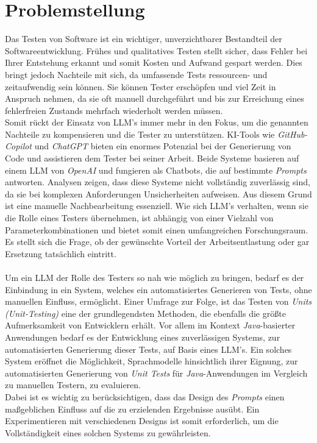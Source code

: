 \section{Problemstellung}\label{sec:prob}
Das Testen von Software ist ein wichtiger, unverzichtbarer Bestandteil der Softwareentwicklung. Frühes und qualitatives Testen stellt sicher, dass Fehler bei Ihrer Entstehung erkannt und somit Kosten und Aufwand gespart werden. Dies bringt jedoch Nachteile mit sich, da umfassende Tests ressourcen- und zeitaufwendig sein können. Sie können Tester erschöpfen und viel Zeit in Anspruch nehmen, da sie oft manuell durchgeführt und bis zur Erreichung eines fehlerfreien Zustands mehrfach wiederholt werden müssen. \cite{pargaonkar_study_2023}\\ Somit rückt der Einsatz von LLM's immer mehr in den Fokus, um die genannten Nachteile zu kompensieren und die Tester zu unterstützen. KI-Tools wie \textit{GitHub-Copilot} und \textit{ChatGPT} bieten ein enormes Potenzial bei der Generierung von Code und assistieren dem Tester bei seiner Arbeit. Beide Systeme basieren auf einem LLM von \textit{OpenAI} und fungieren als Chatbots, die auf bestimmte \textit{Prompts} antworten. Analysen zeigen, dass diese Systeme nicht vollständig zuverlässig sind, da sie bei komplexen Anforderungen Unsicherheiten aufweisen. \cite{poldrack_ai-assisted_2023} Aus diesem Grund ist eine manuelle Nachbearbeitung essenziell. Wie sich LLM's verhalten, wenn sie die Rolle eines Testers übernehmen, ist abhängig von einer Vielzahl von Parameterkombinationen und bietet somit einen umfangreichen Forschungsraum. Es stellt sich die Frage, ob der gewünschte Vorteil der Arbeitsentlastung oder gar Ersetzung tatsächlich eintritt.\\\\ Um ein LLM der Rolle des Testers so nah wie möglich zu bringen, bedarf es der Einbindung in ein System, welches ein automatisiertes Generieren von Tests, ohne manuellen Einfluss, ermöglicht. Einer Umfrage zur Folge, ist das Testen von \textit{Units} \textit{(Unit-Testing)} eine der grundlegendsten Methoden, die ebenfalls die größte Aufmerksamkeit von Entwicklern erhält. \cite{garousi_survey_2013} Vor allem im Kontext \textit{Java}-basierter Anwendungen bedarf es der Entwicklung eines zuverlässigen Systems, zur automatisierten Generierung dieser Tests, auf Basis eines LLM's. Ein solches System eröffnet die Möglichkeit, Sprachmodelle hinsichtlich ihrer Eignung, zur automatisierten Generierung von \textit{Unit Tests} für \textit{Java}-Anwendungen im Vergleich zu manuellen Testern, zu evaluieren.\\ Dabei ist es wichtig zu berücksichtigen, dass das Design des \textit{Prompts} einen maßgeblichen Einfluss auf die zu erzielenden Ergebnisse ausübt. Ein Experimentieren mit verschiedenen Designs ist somit erforderlich, um die Vollständigkeit eines solchen Systems zu gewährleisten.


